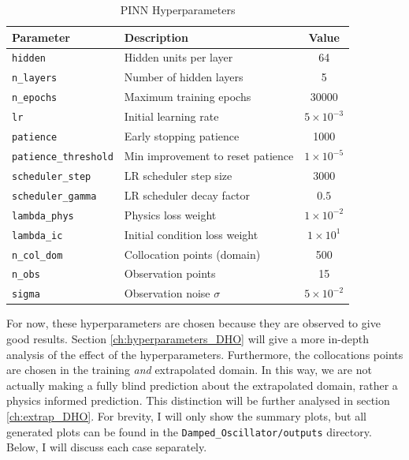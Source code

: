 \documentclass[we,twoside,openright,a4paper,11pt]{uantwerpenbamathesis}
\begin{document}
\begin{table}[H]
\centering
\caption{PINN Hyperparameters}\label{tab:standard_parameters_DHO}
\begin{tabular}{llc}
\toprule
\textbf{Parameter} & \textbf{Description} & \textbf{Value} \\
\midrule
\texttt{hidden}               & Hidden units per layer            & 64                   \\
\texttt{n\_layers}            & Number of hidden layers           & 5                    \\
\texttt{n\_epochs}            & Maximum training epochs           & 30000                \\
\texttt{lr}                   & Initial learning rate             & $5\times10^{-3}$     \\
\texttt{patience}             & Early stopping patience           & 1000                 \\
\texttt{patience\_threshold}  & Min improvement to reset patience & $1\times10^{-5}$     \\
\texttt{scheduler\_step}      & LR scheduler step size            & 3000                 \\
\texttt{scheduler\_gamma}     & LR scheduler decay factor         & $0.5$                \\
\texttt{lambda\_phys}         & Physics loss weight               & $1\times10^{-2}$     \\
\texttt{lambda\_ic}           & Initial condition loss weight     & $1\times10^{1}$      \\
\texttt{n\_col\_dom}          & Collocation points (domain)       & 500                  \\
\texttt{n\_obs}               & Observation points                & 15                   \\
\texttt{sigma}                & Observation noise $\sigma$        & $5\times10^{-2}$     \\
\bottomrule
\end{tabular}
\end{table}

For now, these hyperparameters are chosen because they are observed to give good results. Section \ref{ch:hyperparameters_DHO} will give a more in-depth analysis of the effect of the hyperparameters. Furthermore, the collocations points are chosen in the training \textit{and} extrapolated domain. In this way, we are not actually making a fully blind prediction about the extrapolated domain, rather a physics informed prediction. This distinction will be further analysed in section \ref{ch:extrap_DHO}. For brevity, I will only show the summary plots, but all generated plots can be found in the \verb|Damped_Oscillator/outputs| directory. Below, I will discuss each case separately.
\end{document}
